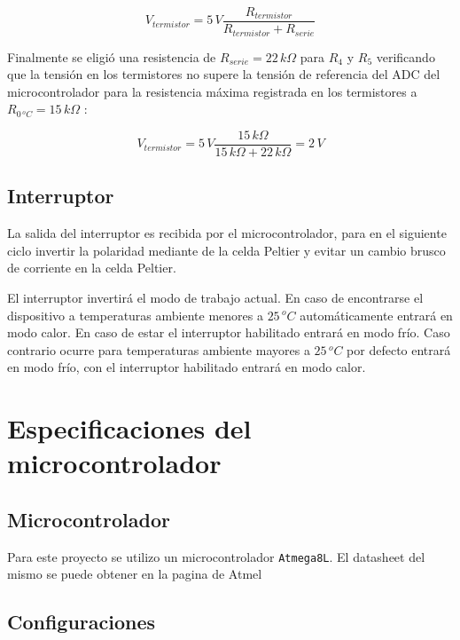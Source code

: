 \documentclass[10pt,spanish,a4paper,openany,notitlepage]{article}
\begin{document}
\begin{equation}
V_{termistor} = 5\, \unit{V} \frac{R_{termistor}}{R_{termistor}+R_{serie}}
\label{eq:tension_termistor}
\end{equation}

Finalmente se eligió una resistencia de $R_{serie} = 22\, \unit{k\Omega}$
para $R_4$ y $R_5$ verificando que la tensión en los termistores no supere
la tensión de referencia del ADC del microcontrolador para la resistencia
máxima registrada en los termistores a $R_{0\,\unit{^oC}} = 15\, \unit{k\Omega}$ :

\[ \displaystyle V_{termistor} = 5\, \unit{V} \frac{15\, \unit{k\Omega}}{15\, \unit{k\Omega}+22\, \unit{k\Omega}} = 2\, \unit{V}\]

\subsection{Interruptor}

La salida del interruptor es recibida por el microcontrolador, para en el siguiente ciclo invertir la polaridad mediante de la celda Peltier y
evitar un cambio brusco de corriente en la celda Peltier.

El interruptor invertirá el modo de trabajo actual. En caso de encontrarse el dispositivo a temperaturas ambiente menores a $25\, \unit{^oC}$
automáticamente entrará en modo calor. En caso de estar el interruptor habilitado entrará en modo frío. Caso contrario ocurre
para temperaturas ambiente mayores a $25\, \unit{^oC}$ por defecto entrará en modo frío, con el interruptor habilitado entrará en modo calor.

\section{Especificaciones del microcontrolador}

\subsection{Microcontrolador}
Para este proyecto se utilizo un microcontrolador \texttt{Atmega8L}. El datasheet del mismo se puede obtener en la pagina de Atmel\cite{datasheet}
\subsection{Configuraciones}
\end{document}
